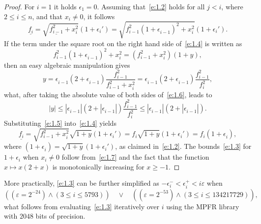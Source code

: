 \documentclass[a4paper,12pt,twoside]{article}
\begin{document}
\begin{proof}
  For $i=1$ it holds $\epsilon_1=0$.  Assuming that~\eqref{e:1.2}
  holds for all $j<i$, where $2\le i\le n$, and that $x_i\ne 0$, it
  follows
  \begin{equation}
    \underline{f_i^{}}=\sqrt{\underline{f_{i-1}^2}+x_i^2}(1+\epsilon_i')=\sqrt{f_{i-1}^2(1+\epsilon_{i-1}^{})^2+x_i^2}(1+\epsilon_i').
    \label{e:1.4}
  \end{equation}
  If the term under the square root on the right hand side
  of~\eqref{e:1.4} is written as
  \begin{equation}
    f_{i-1}^2(1+\epsilon_{i-1}^{})^2+x_i^2=(f_{i-1}^2+x_i^2)(1+y),
    \label{e:1.5}
  \end{equation}
  then an easy algebraic manipulation gives
  \begin{equation}
    y=\epsilon_{i-1}^{}(2+\epsilon_{i-1}^{})\frac{f_{i-1}^2}{f_{i-1}^2+x_i^2}=\epsilon_{i-1}^{}(2+\epsilon_{i-1}^{})\frac{f_{i-1}^2}{f_i^2},
    \label{e:1.6}
  \end{equation}
  what, after taking the absolute value of both sides of~\eqref{e:1.6},
  leads to
  \begin{equation}
    |y|\le|\epsilon_{i-1}^{}|(2+|\epsilon_{i-1}^{}|)\frac{f_{i-1}^2}{f_i^2}\le|\epsilon_{i-1}^{}|(2+|\epsilon_{i-1}^{}|).
    \label{e:1.7}
  \end{equation}
  Substituting~\eqref{e:1.5} into~\eqref{e:1.4} yields
  \begin{displaymath}
    \underline{f_i^{}}=\sqrt{f_{i-1}^2+x_i^2}\sqrt{1+y}(1+\epsilon_i')=f_i^{}\sqrt{1+y}(1+\epsilon_i')=f_i^{}(1+\epsilon_i^{}),
  \end{displaymath}
  where $(1+\epsilon_i^{})=\sqrt{1+y}(1+\epsilon_i')$, as claimed
  in~\eqref{e:1.2}.  The bounds~\eqref{e:1.3} for $1+\epsilon_i$ when
  $x_i\ne 0$ follow from~\eqref{e:1.7} and the fact that the function
  $x\mapsto x(2+x)$ is monotonically increasing for $x\ge-1$.
\end{proof}

More practically, \eqref{e:1.3} can be further simplified as
$-\epsilon_i^-<\epsilon_i^+<i\varepsilon$ when
\begin{displaymath}
  ((\varepsilon=2^{-24})\wedge(3\le i\le 5793))\quad\vee\quad((\varepsilon=2^{-53})\wedge(3\le i\le 134217729)),
\end{displaymath}
what follows from evaluating~\eqref{e:1.3} iteratively over $i$ using
the MPFR library~\cite{Fousse-et-al-07} with $2048$ bits of precision.
\end{document}
